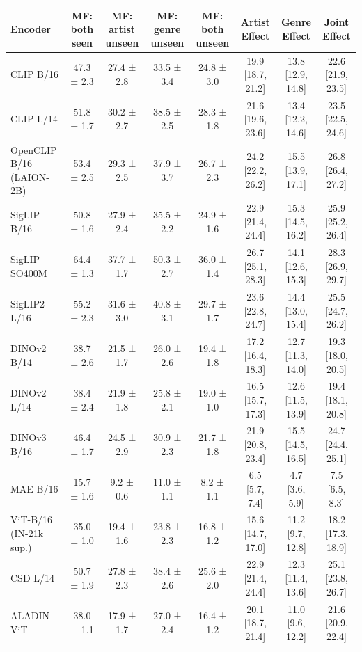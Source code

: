 \begin{tabular}{lccccccc}
\toprule
Encoder & MF: both seen & MF: artist unseen & MF: genre unseen & MF: both unseen & Artist Effect & Genre Effect & Joint Effect \\
\midrule
CLIP B/16 & 47.3 ± 2.3 & 27.4 ± 2.8 & 33.5 ± 3.4 & 24.8 ± 3.0 & 19.9 [18.7, 21.2] & 13.8 [12.9, 14.8] & 22.6 [21.9, 23.5] \\
CLIP L/14 & 51.8 ± 1.7 & 30.2 ± 2.7 & 38.5 ± 2.5 & 28.3 ± 1.8 & 21.6 [19.6, 23.6] & 13.4 [12.2, 14.6] & 23.5 [22.5, 24.6] \\
OpenCLIP B/16 (LAION-2B) & 53.4 ± 2.5 & 29.3 ± 2.5 & 37.9 ± 3.7 & 26.7 ± 2.3 & 24.2 [22.2, 26.2] & 15.5 [13.9, 17.1] & 26.8 [26.4, 27.2] \\
SigLIP B/16 & 50.8 ± 1.6 & 27.9 ± 2.4 & 35.5 ± 2.2 & 24.9 ± 1.6 & 22.9 [21.4, 24.4] & 15.3 [14.5, 16.2] & 25.9 [25.2, 26.4] \\
SigLIP SO400M & 64.4 ± 1.3 & 37.7 ± 1.7 & 50.3 ± 2.7 & 36.0 ± 1.4 & 26.7 [25.1, 28.3] & 14.1 [12.6, 15.3] & 28.3 [26.9, 29.7] \\
SigLIP2 L/16 & 55.2 ± 2.3 & 31.6 ± 3.0 & 40.8 ± 3.1 & 29.7 ± 1.7 & 23.6 [22.8, 24.7] & 14.4 [13.0, 15.4] & 25.5 [24.7, 26.2] \\
DINOv2 B/14 & 38.7 ± 2.6 & 21.5 ± 1.7 & 26.0 ± 2.6 & 19.4 ± 1.8 & 17.2 [16.4, 18.3] & 12.7 [11.3, 14.0] & 19.3 [18.0, 20.5] \\
DINOv2 L/14 & 38.4 ± 2.4 & 21.9 ± 1.8 & 25.8 ± 2.1 & 19.0 ± 1.0 & 16.5 [15.7, 17.3] & 12.6 [11.5, 13.9] & 19.4 [18.1, 20.8] \\
DINOv3 B/16 & 46.4 ± 1.7 & 24.5 ± 2.9 & 30.9 ± 2.3 & 21.7 ± 1.8 & 21.9 [20.8, 23.4] & 15.5 [14.5, 16.5] & 24.7 [24.4, 25.1] \\
MAE B/16 & 15.7 ± 1.6 & 9.2 ± 0.6 & 11.0 ± 1.1 & 8.2 ± 1.1 & 6.5 [5.7, 7.4] & 4.7 [3.6, 5.9] & 7.5 [6.5, 8.3] \\
ViT-B/16 (IN-21k sup.) & 35.0 ± 1.0 & 19.4 ± 1.6 & 23.8 ± 2.3 & 16.8 ± 1.2 & 15.6 [14.7, 17.0] & 11.2 [9.7, 12.8] & 18.2 [17.3, 18.9] \\
CSD L/14 & 50.7 ± 1.9 & 27.8 ± 2.3 & 38.4 ± 2.6 & 25.6 ± 2.0 & 22.9 [21.4, 24.4] & 12.3 [11.4, 13.6] & 25.1 [23.8, 26.7] \\
ALADIN-ViT & 38.0 ± 1.1 & 17.9 ± 1.7 & 27.0 ± 2.4 & 16.4 ± 1.2 & 20.1 [18.7, 21.4] & 11.0 [9.6, 12.2] & 21.6 [20.9, 22.4] \\
\bottomrule
\end{tabular}
